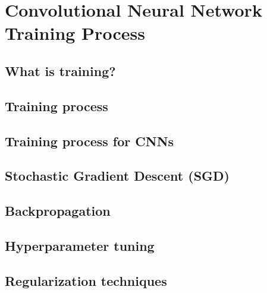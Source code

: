 
\chapter{Convolutional Neural Network Training Process}

\section{What is training?}
\section{Training process}
\section{Training process for CNNs}
\section{Stochastic Gradient Descent (SGD)}
\section{Backpropagation}
\section{Hyperparameter tuning}
\section{Regularization techniques}

